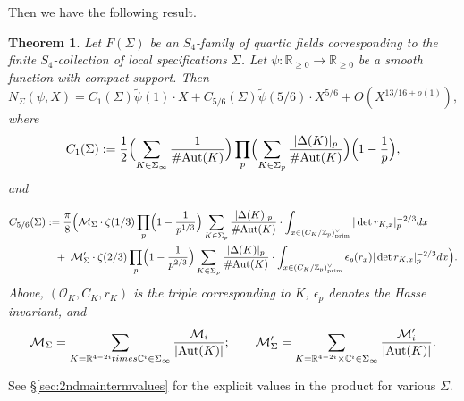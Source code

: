 \documentclass{article}
\def\Z{{\mathbb Z}}
\def\Aut{{\rm Aut}}
\def\prim{{\rm prim}}
\def\R{{\mathbb R}}
\def\cO{{\mathcal O}}
\def\Z{{\mathbb Z}}
\def\C{{\mathbb C}}
\def\wt{\widetilde}
\newtheorem{Theorem}{Theorem}
\begin{document}
Then we have the following result.

\begin{Theorem}\label{thm:mainS4fields}
Let $F(\Sigma)$ be an $S_4$-family of quartic fields corresponding to the finite $S_4$-collection of local specifications $\Sigma$. Let $\psi:\R_{\geq 0}\to\R_{\geq 0}$ be a smooth function with compact support. Then 
\begin{equation*}
N_{\Sigma}(\psi,X)=C_1(\Sigma)\wt{\psi}(1)\cdot X+ C_{5/6}(\Sigma)\wt{\psi}(5/6)\cdot X^{5/6} + O(X^{13/16+o(1)}),
\end{equation*}
where
\begin{equation}\label{eq:leadingcons}
C_1(\Sigma):=\frac{1}{2}\Bigl(\sum_{K\in\Sigma_\infty}\frac{1}{\#\Aut(K)}\Bigr)\prod_p
\Bigl(\sum_{K\in\Sigma_p}\frac{|\Delta(K)|_p}{\#\Aut(K)}\Bigr)\Bigl(1-\frac{1}{p}\Bigr),
\end{equation} and

\begin{align*}    
C_{5/6}(\Sigma)&:=\frac{\pi}{8}\Bigl(\mathcal M_{\Sigma}\cdot\zeta(1/3)\prod_{p}\Bigl(1-\frac{1}{p^{1/3}}\Bigr)\sum_{K\in\Sigma_p}\frac{|\Delta(K)|_p}{\#\Aut(K)}\cdot \int_{x\in (C_K/\Z_p)^{\vee}_{\prim}}  |\det{r_{K,x}}|_p^{-2/3}dx \\&\;\;\;+ \;\mathcal M_\Sigma'\cdot\zeta(2/3)\prod_{p}\Bigl(1-\frac{1}{p^{2/3}}\Bigr)\sum_{K\in\Sigma_p}\frac{|\Delta(K)|_p}{\#\Aut(K)}\cdot \int_{x\in (C_K/\Z_p)^{\vee}_{\prim}}  \epsilon_p(r_x)|\det{r_{K,x}}|_p^{-2/3}dx\Bigr).
\end{align*}
Above, $(\cO_K,C_K,r_K)$ is the triple corresponding to $K$, $\epsilon_p$ denotes the Hasse invariant, and 
\begin{equation*}
\mathcal M_\Sigma = \sum_{K=\R^{4-2i}times\C^i\in\Sigma_\infty}\frac{\mathcal M_i}{|\Aut(K)|};
\quad\quad
\mathcal M_\Sigma' = 
\sum_{K=\R^{4-2i}\times\C^i\in\Sigma_\infty}\frac{\mathcal M_i'}{|\Aut(K)|}.
\end{equation*}
\end{Theorem}
See \S\ref{sec:2ndmaintermvalues} for the explicit values in the product for various $\Sigma$.
\end{document}
